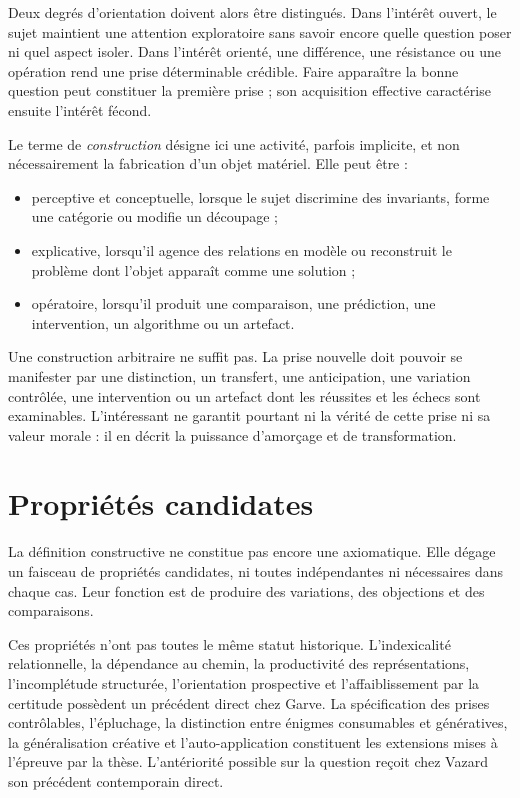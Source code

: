 \documentclass[11pt,a4paper]{article}
\begin{document}
Deux degrés d'orientation doivent alors être distingués. Dans l'intérêt ouvert,
le sujet maintient une attention exploratoire sans savoir encore quelle question
poser ni quel aspect isoler. Dans l'intérêt orienté, une différence, une
résistance ou une opération rend une prise déterminable crédible. Faire
apparaître la bonne question peut constituer la première prise ; son acquisition
effective caractérise ensuite l'intérêt fécond.

Le terme de \emph{construction} désigne ici une activité, parfois implicite, et
non nécessairement la fabrication d'un objet matériel. Elle peut être :

\begin{itemize}
  \item perceptive et conceptuelle, lorsque le sujet discrimine des invariants,
        forme une catégorie ou modifie un découpage ;
  \item explicative, lorsqu'il agence des relations en modèle ou reconstruit le
        problème dont l'objet apparaît comme une solution ;
  \item opératoire, lorsqu'il produit une comparaison, une prédiction, une
        intervention, un algorithme ou un artefact.
\end{itemize}

Une construction arbitraire ne suffit pas. La prise nouvelle doit pouvoir se
manifester par une distinction, un transfert, une anticipation, une variation
contrôlée, une intervention ou un artefact dont les réussites et les échecs sont
examinables. L'intéressant ne garantit pourtant ni la vérité de cette prise ni
sa valeur morale : il en décrit la puissance d'amorçage et de transformation.

\section{Propriétés candidates}

La définition constructive ne constitue pas encore une axiomatique. Elle dégage
un faisceau de propriétés candidates, ni toutes indépendantes ni nécessaires
dans chaque cas. Leur fonction est de produire des variations, des objections
et des comparaisons.

Ces propriétés n'ont pas toutes le même statut historique. L'indexicalité
relationnelle, la dépendance au chemin, la productivité des représentations,
l'incomplétude structurée, l'orientation prospective et l'affaiblissement par
la certitude possèdent un précédent direct chez Garve. La spécification des
prises contrôlables, l'épluchage, la distinction entre énigmes consumables et
génératives, la généralisation créative et l'auto-application constituent les
extensions mises à l'épreuve par la thèse. L'antériorité possible sur la
question reçoit chez Vazard son précédent contemporain direct.
\end{document}
